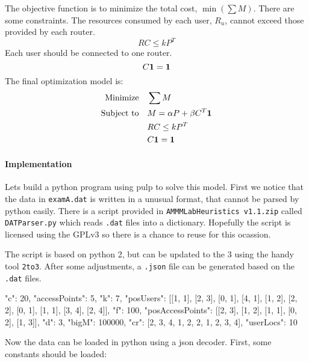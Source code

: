 \documentclass[11pt,a4paper]{article}
\newcommand*\mat[1]{ \begin{pmatrix} #1 \end{pmatrix}}
\begin{document}
The objective function is to minimize the total cost, $\min(\sum M)$.
There are some constraints. The resources consumed by each user, $R_u$, cannot 
exceed those provided by each router.
%
$$ RC \le k P^T $$
%
Each user should be connected to one router.
%
$$ C \bf{1} = \bf{1} $$
%
The final optimization model is:
%
\begin{align}
\text{Minimize} \quad & \sum M \nonumber \\
\text{Subject to}	\quad & M = \alpha P + \beta C^T \bf{1} \\
& RC \le k P^T \\
& C \bf{1} = \bf{1}
\end{align}

\paragraph*{Implementation}
Lets build a python program using pulp to solve this model. First we notice that 
the data in {\tt examA.dat} is written in a unusual format, that cannot be 
parsed by python easily. There is a script provided in {\tt AMMMLabHeuristics 
v1.1.zip} called {\tt DATParser.py} which reads {\tt .dat} files into a 
dictionary. Hopefully the script is licensed using the GPLv3 so there is a 
chance to reuse for this ocassion.

The script is based on python 2, but can be updated to the 3 using the handy 
tool {\tt 2to3}. After some adjustments, a {\tt .json} file can be generated 
based on the {\tt .dat} files.
%
\begin{textcode}
{"c": 20, "accessPoints": 5, "k": 7, "posUsers": [[1, 1], [2, 3], [0, 1], [4, 
1], [1, 2], [2, 2], [0, 1], [1, 1], [3, 4], [2, 4]], "f": 100, 
"posAccessPoints": [[2, 3], [1, 2], [1, 1], [0, 2], [1, 3]], "d": 3, "bigM": 
100000, "cr": [2, 3, 4, 1, 2, 2, 1, 2, 3, 4], "userLocs": 10}
\end{textcode}
%
Now the data can be loaded in python using a json decoder. First, some constants 
should be loaded:
\end{document}
